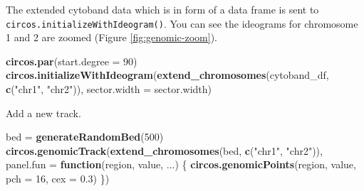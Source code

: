 \documentclass[]{book}
\newenvironment{Shaded}{\begin{snugshade}}{\end{snugshade}}
\newcommand{\KeywordTok}[1]{\textcolor[rgb]{0.13,0.29,0.53}{\textbf{#1}}}
\newcommand{\DataTypeTok}[1]{\textcolor[rgb]{0.13,0.29,0.53}{#1}}
\newcommand{\DecValTok}[1]{\textcolor[rgb]{0.00,0.00,0.81}{#1}}
\newcommand{\FloatTok}[1]{\textcolor[rgb]{0.00,0.00,0.81}{#1}}
\newcommand{\StringTok}[1]{\textcolor[rgb]{0.31,0.60,0.02}{#1}}
\newcommand{\CommentTok}[1]{\textcolor[rgb]{0.56,0.35,0.01}{\textit{#1}}}
\newcommand{\ControlFlowTok}[1]{\textcolor[rgb]{0.13,0.29,0.53}{\textbf{#1}}}
\newcommand{\OperatorTok}[1]{\textcolor[rgb]{0.81,0.36,0.00}{\textbf{#1}}}
\newcommand{\NormalTok}[1]{#1}
\begin{document}
\begin{Shaded}
\end{Shaded}

The extended cytoband data which is in form of a data frame is sent to
\texttt{circos.initializeWithIdeogram()}. You can see the ideograms for
chromosome 1 and 2 are zoomed (Figure \ref{fig:genomic-zoom}).

\begin{Shaded}
\begin{Highlighting}[]
\KeywordTok{circos.par}\NormalTok{(}\DataTypeTok{start.degree =} \DecValTok{90}\NormalTok{)}
\KeywordTok{circos.initializeWithIdeogram}\NormalTok{(}\KeywordTok{extend_chromosomes}\NormalTok{(cytoband_df, }\KeywordTok{c}\NormalTok{(}\StringTok{"chr1"}\NormalTok{, }\StringTok{"chr2"}\NormalTok{)), }
    \DataTypeTok{sector.width =}\NormalTok{ sector.width)}
\end{Highlighting}
\end{Shaded}

Add a new track.

\begin{Shaded}
\begin{Highlighting}[]
\NormalTok{bed =}\StringTok{ }\KeywordTok{generateRandomBed}\NormalTok{(}\DecValTok{500}\NormalTok{)}
\KeywordTok{circos.genomicTrack}\NormalTok{(}\KeywordTok{extend_chromosomes}\NormalTok{(bed, }\KeywordTok{c}\NormalTok{(}\StringTok{"chr1"}\NormalTok{, }\StringTok{"chr2"}\NormalTok{)),}
    \DataTypeTok{panel.fun =} \ControlFlowTok{function}\NormalTok{(region, value, ...) \{}
        \KeywordTok{circos.genomicPoints}\NormalTok{(region, value, }\DataTypeTok{pch =} \DecValTok{16}\NormalTok{, }\DataTypeTok{cex =} \FloatTok{0.3}\NormalTok{)}
\NormalTok{\})}
\end{Highlighting}
\end{Shaded}
\end{document}
